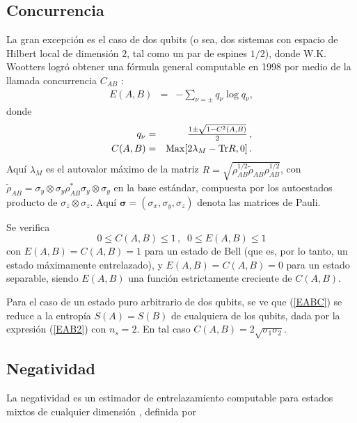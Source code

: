 \subsection{Concurrencia \label{Concu}}
La gran excepción es el caso de dos qubits (o sea, dos sistemas con espacio de Hilbert 
local de dimensión $2$, tal como un par de espines $1/2$), donde W.K. Wootters logró obtener una fórmula general computable en 1998 por
medio de la llamada concurrencia $C_{AB}$ \cite{W.98}: 
\begin{eqnarray}
E(A,B)&=&-\sum_{\nu=\pm}q_\nu\log  q_\nu,\label{EABC}\end{eqnarray}
donde 
\begin{eqnarray}
q_\nu&=&{\textstyle\frac{1\pm\sqrt{1-C^2(A,B)}}{2}}\,,\label{qEABC}\\
C(A,B)&=&{\rm Max}[2\lambda_M-{\rm Tr}R,0]\,.
\label{CAB}\end{eqnarray}
Aquí $\lambda_M$ es el autovalor m\'aximo de la matriz
$R=\sqrt{\rho_{AB}^{1/2}\tilde{\rho}_{AB} \rho_{AB}^{1/2}}$, con
$\tilde{\rho}_{AB}=\sigma_y\otimes
\sigma_y\rho_{AB}^{*}\sigma_y\otimes\sigma_y$ en la base estándar, 
compuesta por los autoestados producto de $\sigma_{z}\otimes\sigma_z$. Aquí
$\bm{\sigma}=(\sigma_x,\sigma_y,\sigma_z)$ denota las matrices de Pauli. 

Se verifica 
\begin{equation}
0\leq C(A,B)\leq 1\,,\;\;0\leq E(A,B)\leq 1
\end{equation}
 con $E(A,B)=C(A,B)=1$  para  un estado de Bell (que es, por lo tanto, un estado m\'aximamente entrelazado), y 
$E(A,B)=C(A,B)=0$ para un estado separable, siendo
$E(A,B)$ una función estrictamente creciente de $C(A,B)$. 

Para el caso de un estado puro arbitrario de dos qubits, se ve que
(\ref{EABC}) se reduce a la entropía $S(A)=S(B)$ de cualquiera de los
qubits, dada por la expresión (\ref{EAB2}) con $n_s=2$.
En tal caso $C(A,B)=2\sqrt{\sigma_1\sigma_2}$.

\subsection{Negatividad \label{negatividad}}
La negatividad es un estimador de entrelazamiento computable para estados mixtos de cualquier dimensión \cite{VW.02,ZHSL.99,ZHSL.99b}, definida por 

